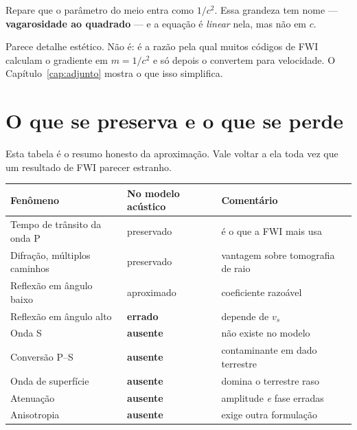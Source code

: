 \documentclass[11pt,a4paper,oneside]{report}
\begin{document}
\begin{atencao}
Repare que o par\^ametro do meio entra como $1/c^{2}$. Essa grandeza tem
nome --- \textbf{vagarosidade ao quadrado} --- e a equa\c{c}\~ao \'e
\emph{linear} nela, mas n\~ao em $c$.

Parece detalhe est\'etico. N\~ao \'e: \'e a raz\~ao pela qual muitos
c\'odigos de FWI calculam o gradiente em $m = 1/c^{2}$ e s\'o depois o convertem
para velocidade. O Cap\'itulo~\ref{cap:adjunto}
mostra o que isso simplifica.
\end{atencao}


\section{O que se preserva e o que se perde}

Esta tabela \'e o resumo honesto da aproxima\c{c}\~ao. Vale voltar a ela toda
vez que um resultado de FWI parecer estranho.

\begin{center}
\begin{tabular}{@{}llp{6.2cm}@{}}
\toprule
\textbf{Fen\^omeno} & \textbf{No modelo ac\'ustico} & \textbf{Coment\'ario} \\
\midrule
Tempo de tr\^ansito da onda P & preservado & \'e o que a FWI mais usa \\
Difra\c{c}\~ao, m\'ultiplos caminhos & preservado & vantagem sobre tomografia de raio \\
Reflex\~ao em \^angulo baixo & aproximado & coeficiente razo\'avel \\
Reflex\~ao em \^angulo alto & \textbf{errado} & depende de $v_s$ \\
Onda S & \textbf{ausente} & n\~ao existe no modelo \\
Convers\~ao P--S & \textbf{ausente} & contaminante em dado terrestre \\
Onda de superf\'icie & \textbf{ausente} & domina o terrestre raso \\
Atenua\c{c}\~ao & \textbf{ausente} & amplitude \emph{e} fase erradas \\
Anisotropia & \textbf{ausente} & exige outra formula\c{c}\~ao \\
\bottomrule
\end{tabular}
\end{center}
\end{document}
